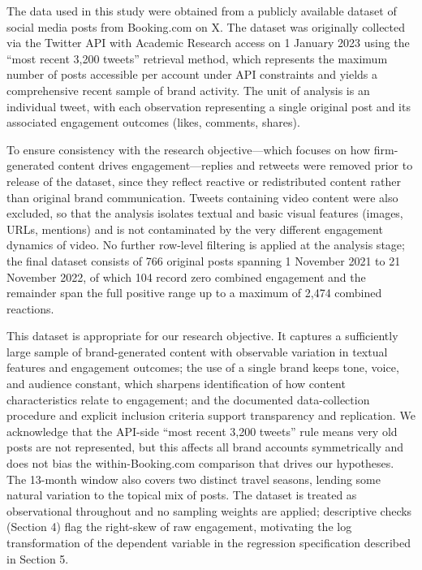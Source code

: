 \documentclass[12pt,a4paper]{article}
\begin{document}
The data used in this study were obtained from a publicly available dataset of social media posts from Booking.com on X. The dataset was originally collected via the Twitter API with Academic Research access on 1 January 2023 using the ``most recent 3{,}200 tweets'' retrieval method, which represents the maximum number of posts accessible per account under API constraints and yields a comprehensive recent sample of brand activity. The unit of analysis is an individual tweet, with each observation representing a single original post and its associated engagement outcomes (likes, comments, shares).

To ensure consistency with the research objective---which focuses on how firm-generated content drives engagement---replies and retweets were removed prior to release of the dataset, since they reflect reactive or redistributed content rather than original brand communication. Tweets containing video content were also excluded, so that the analysis isolates textual and basic visual features (images, URLs, mentions) and is not contaminated by the very different engagement dynamics of video. No further row-level filtering is applied at the analysis stage; the final dataset consists of 766 original posts spanning 1 November 2021 to 21 November 2022, of which 104 record zero combined engagement and the remainder span the full positive range up to a maximum of 2{,}474 combined reactions.

This dataset is appropriate for our research objective. It captures a sufficiently large sample of brand-generated content with observable variation in textual features and engagement outcomes; the use of a single brand keeps tone, voice, and audience constant, which sharpens identification of how content characteristics relate to engagement; and the documented data-collection procedure and explicit inclusion criteria support transparency and replication. We acknowledge that the API-side ``most recent 3{,}200 tweets'' rule means very old posts are not represented, but this affects all brand accounts symmetrically and does not bias the within-Booking.com comparison that drives our hypotheses. The 13-month window also covers two distinct travel seasons, lending some natural variation to the topical mix of posts. The dataset is treated as observational throughout and no sampling weights are applied; descriptive checks (Section 4) flag the right-skew of raw engagement, motivating the log transformation of the dependent variable in the regression specification described in Section 5.
\end{document}

